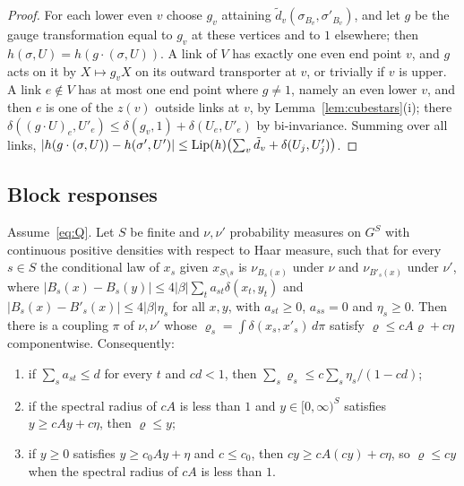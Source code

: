 \begin{proof}
For each lower even $v$ choose $g_v$ attaining $\tilde d_v(\sigma_{B_v},
\sigma'_{B_v})$, and let $g$ be the gauge transformation equal to $g_v$ at
these vertices and to $1$ elsewhere; then $h(\sigma,U)=h(g\cdot(\sigma,U))$. A
link of $V$ has exactly one even end point $v$, and $g$ acts on it by $X\mapsto
g_vX$ on its outward transporter at $v$, or trivially if $v$ is upper. A link
$e\notin V$ has at most one end point where $g\ne1$, namely an even lower
$v$, and then $e$ is one of the $z(v)$ outside links at $v$, by
Lemma~\ref{lem:cubestars}(i); there $\delta((g\cdot U)_e,U'_e)\le\delta(g_v,1)+
\delta(U_e,U'_e)$ by bi-invariance. Summing over all links,
$|h(g\cdot(\sigma,U))-h(\sigma',U')|\le\operatorname{Lip}(h)\bigl(\sum_v\tilde d_v+
\delta(U_j,U'_j)\bigr)$.
\end{proof}

\subsection{Block responses}

\begin{lemma}[Dobrushin on $S^3$]\label{lem:dobS3}
Assume~\eqref{eq:Q}. Let $S$ be finite and $\nu,\nu'$ probability measures on
$G^S$ with continuous positive densities with respect to Haar measure, such
that for every $s\in S$ the conditional law of $x_s$ given $x_{S\setminus s}$
is $\nu_{B_s(x)}$ under $\nu$ and $\nu_{B'_s(x)}$ under $\nu'$, where
$|B_s(x)-B_s(y)|\le4|\beta|\sum_ta_{st}\delta(x_t,y_t)$ and
$|B_s(x)-B'_s(x)|\le4|\beta|\eta_s$ for all $x,y$, with $a_{st}\ge0$,
$a_{ss}=0$ and $\eta_s\ge0$. Then there is a coupling $\pi$ of $\nu,\nu'$ whose
$\varrho_s=\int\delta(x_s,x'_s)\,d\pi$ satisfy $\varrho\le cA\varrho+c\eta$
componentwise. Consequently:
\begin{enumerate}[label=\textup{(\alph*)},leftmargin=*]
\item if $\sum_sa_{st}\le d$ for every $t$ and $cd<1$, then
$\sum_s\varrho_s\le c\sum_s\eta_s/(1-cd)$;
\item if the spectral radius of $cA$ is less than $1$ and $y\in[0,\infty)^S$
satisfies $y\ge cAy+c\eta$, then $\varrho\le y$;
\item if $y\ge0$ satisfies $y\ge c_0Ay+\eta$ and $c\le c_0$, then $cy\ge
cA(cy)+c\eta$, so $\varrho\le cy$ when the spectral radius of $cA$ is less
than $1$.
\end{enumerate}
\end{lemma}

